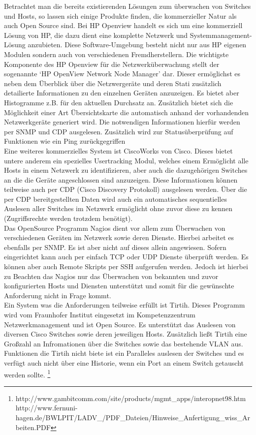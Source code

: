 Betrachtet man die bereits existierenden Lösungen zum überwachen von Switches und Hosts, so lassen sich einige Produkte finden, die kommerzieller Natur als auch Open Source sind.
Bei HP Openview handelt es sich um eine kommerziell Lösung von HP, die dazu dient eine komplette Netzwerk und Systemmanagement-Lösung anzubieten. Diese Software-Umgebung besteht nicht nur aus HP eigenen Modulen sondern auch von verschiedenen Fremdherstellern.
Die wichtigste Komponente des HP Openview für die Netzwerküberwachung stellt der sogenannte ‘HP OpenView Network Node Manager’ dar. Dieser ermöglichst es neben dem Überblick über die Netzwergeräte und deren Stati zusätzlich detailierte Informationen zu den einzelnen Geräten anzuzeigen. Es bietet aber Histogramme z.B. für den aktuellen Durchsatz an.
Zusätzlich bietet sich die Möglichkeit einer Art Übersichtskarte die automatisch anhand der vorhandenden Netzwerkgeräte generiert wird. Die notwendigen Informationen hierfür werden per SNMP und CDP ausgelesen. Zusätzlich wird zur Statusüberprüfung auf Funktionen wie ein Ping zurückgegriffen\\
Eine weiteres kommerzielles System ist CiscoWorks von Cisco. Dieses bietet untere anderem ein spezielles Usertracking Modul, welches einem Ermöglicht alle Hosts in einem Netzwerk zu identifizieren, aber auch die dazugehörigen Switches an die die Geräte angeschlossen sind anzuzeigen. Diese Informationen können teilweise auch per CDP (Cisco Discovery Protokoll) ausgelesen werden. Über die per CDP bereitgestellten Daten wird auch ein automatisches sequentielles Auslesen aller Switches im Netzwerk ermöglicht ohne zuvor diese zu kennen (Zugriffsrechte werden trotzdem benötigt).\\
Das OpenSource Programm Nagios dient vor allem zum Überwachen von verschiedenen Geräten im Netzwerk sowie deren Dienste. Hierbei arbeitet es ebenfalls per SNMP. Es ist aber nicht auf dieses allein angewiesen. Sofern eingerichtet kann auch per einfach TCP oder UDP Dienste überprüft werden. Es können aber auch Remote Skripts per SSH aufgerufen werden.
Jedoch ist hierbei zu Beachten das Nagios nur das Überwachen von bekannten und zuvor konfigurierten Hosts und Diensten unterstützt und somit für die gewünschte Anforderung nicht in Frage kommt.\\
Ein System  was die Anforderungen teilweise erfüllt ist Tirtih. Dieses Programm wird vom Fraunhofer Institut eingesetzt im Kompetenzzentrum Netzwerkmanagement und ist Open Source. Es unterstützt das Auslesen von diversen Cisco Switches sowie deren jeweiligen Hosts.
Zusätzlich ließt Tirtih eine Großzahl an Infromationen über die Switches sowie das bestehende VLAN aus. Funktionen die Tirtih nicht biete ist ein Paralleles auslesen der Switches und es verfügt auch nicht über eine Historie, wenn ein Port an einem Switch getauscht werden sollte.
\footnote{http://www.gambitcomm.com/site/products/mgmt\_apps/interopnet98.htm
http://www.fernuni-hagen.de/BWLPIT/LADV\_/PDF\_Dateien/Hinweise\_Anfertigung\_wiss\_Arbeiten.PDF}


